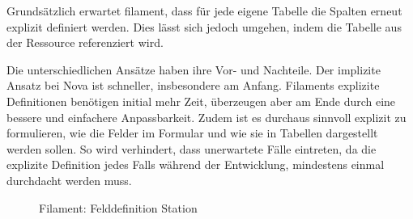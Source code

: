 Grundsätzlich erwartet filament, dass für jede eigene Tabelle die Spalten erneut explizit definiert werden.
Dies lässt sich jedoch umgehen, indem die Tabelle aus der Ressource referenziert wird.

Die unterschiedlichen Ansätze haben ihre Vor- und Nachteile.
Der implizite Ansatz bei Nova ist schneller, insbesondere am Anfang.
Filaments explizite Definitionen benötigen initial mehr Zeit, überzeugen aber am Ende durch eine bessere und einfachere Anpassbarkeit.
Zudem ist es durchaus sinnvoll explizit zu formulieren, wie die Felder im Formular und wie sie in Tabellen dargestellt werden sollen.
So wird verhindert, dass unerwartete Fälle eintreten, da die explizite Definition jedes Falls während der Entwicklung, mindestens einmal durchdacht werden muss.

\begin{figure}[h!]
    \centering
    \caption{Filament: Felddefinition Station}
    \label{fig:station_fields_filament}
\end{figure}
